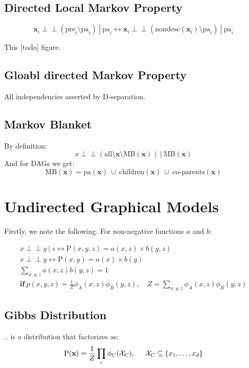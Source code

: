 \documentclass{article}
\newcommand{\prob}{\text{P}}
\newcommand{\pr}{\prob}
\newcommand{\pre}{\text{pre}_i}
\newcommand{\pa}{\text{pa}_i}
\renewcommand{\vec}[1]{\mathbf{#1}}
\newcommand{\bx}{\vec{x}}
\newcommand{\giv}{\ |\ }
\newcommand\indep{\!\perp\!\!\!\perp}
\begin{document}
\subsection{Directed Local Markov Property}
\begin{equation*}
    \bx_i \indep (\pre \setminus \pa) \giv \pa \leftrightarrow \bx_i \indep (\text{nondesc}(\bx_i) \setminus \pa) \giv \pa
\end{equation*}

This [todo] figure.

\subsection{Gloabl directed Markov Property}
All independencies asserted by D-separation.

\subsection{Markov Blanket}
By definition:
$$
    x \indep (\text{all} \setminus \bx \setminus \text{MB}(\bx)) \giv \text{MB}(\bx)
$$
And for DAGs we get:
$$
    \text{MB}(\bx) = \text{pa}(\bx)\ \cup\ \text{children} (\bx) \ \cup\ \text{co-parents}(\bx)
$$

\section{Undirected Graphical Models}
Firstly, we note the following. For non-negative functions $a$ and $b$:

\begin{gather*}
    x \indep y \giv z \leftrightarrow \pr(x, y, z) = a(x, z) \times b(y, z) \\
    x \indep y \leftrightarrow \pr(x, y) = a(x) \times b(y) \\
    \sum_{x, y, z} a(x, z) b(y, z) = 1 \\
    \textbf{if} \   p(x, y, z) = \frac{1}{Z} \phi_A(x, z) \phi_B(y, z), \quad
    Z = \sum_{x, y, z} \phi_A(x, z) \phi_B(y, z)
\end{gather*}

\subsection{Gibbs Distribution}
.. is a distribution that factorizes as:
$$
    \pr(\bx) = \frac{1}{Z} \prod_c \phi_C(\mathcal{X}_C), \hspace{0.2in}
    \mathcal{X}_C \subseteq \{ x_1, \dots, x_d \}
$$
\end{document}
